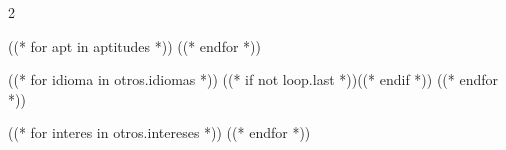 \documentclass[10pt,a4paper,ragged2e,withhyper]{altacv}
\begin{document}
\begin{paracol}{2}
\switchcolumn

((* for apt in aptitudes *))
((* endfor *))

\medskip

((* for idioma in otros.idiomas *))
((* if not loop.last *))\divider((* endif *))
((* endfor *))

\medskip

((* for interes in otros.intereses *))
((* endfor *))

\end{paracol}
\end{document}
